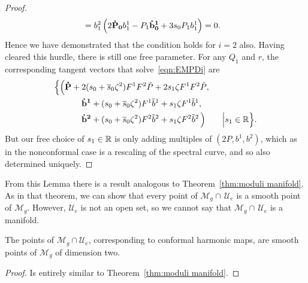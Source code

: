 \documentclass{article}
\begin{document}
\begin{lem}[Case (e)]
\begin{proof}
\begin{align*}
&= b^2_1\left(2 \mathbf{\dot{P}_0} b^1_1 - P_1 \mathbf{\dot{b}^1_0} + 3 s_0 P_1 b^1_1 \right) = 0.
\end{align*}
Hence we have demonstrated that the condition holds for $i=2$ also. Having cleared this hurdle, there is still one free parameter. For any $Q_1$ and $r$, the corresponding tangent vectors that solve~\eqref{eqn:EMPDi} are
\begin{align*}
\Big\{
\Big(&\mathbf{\dot P} + 2(s_0+\overline{s}_0\zeta^2) F^1F^2\tilde{P} + 2s_1\zeta F^1F^2\tilde{P}, \\
&\qquad\mathbf{\dot b^1} + (s_0+\overline{s}_0\zeta^2) F^1\tilde{b}^1 + s_1\zeta F^1\tilde{b}^1, \\
&\qquad\mathbf{\dot b^2} + (s_0+\overline{s}_0\zeta^2) F^2\tilde{b}^2 + s_1\zeta F^2\tilde{b}^2 \,\Big)
\qquad\Big\vert s_1 \in \mathbb{R}
\Big\}.
\end{align*}
But our free choice of $s_1\in\mathbb{R}$ is only adding multiples of $(2P,b^1,b^2)$, which as in the nonconformal case is a rescaling of the spectral curve, and so also determined uniquely.
\end{proof}
\end{lem}

From this Lemma there is a result analogous to Theorem~\ref{thm:moduli manifold}. As in that theorem, we can show that every point of $\mathcal{M}_g \cap\, \mathcal{U}_{e}$ is a smooth point of $\mathcal{M}_g$. However, $\mathcal{U}_{e}$ is not an open set, so we cannot say that $\mathcal{M}_g \cap\, \mathcal{U}_{e}$ is a manifold. 

\begin{thm}\label{thm:conformal moduli manifold}
The points of $\mathcal{M}_g \cap \mathcal{U}_{e}$, corresponding to conformal harmonic maps, are smooth points of $\mathcal{M}_g$ of dimension two.

\begin{proof}
Is entirely similar to Theorem~\ref{thm:moduli manifold}. 
\end{proof}
\end{thm}

\end{document}
